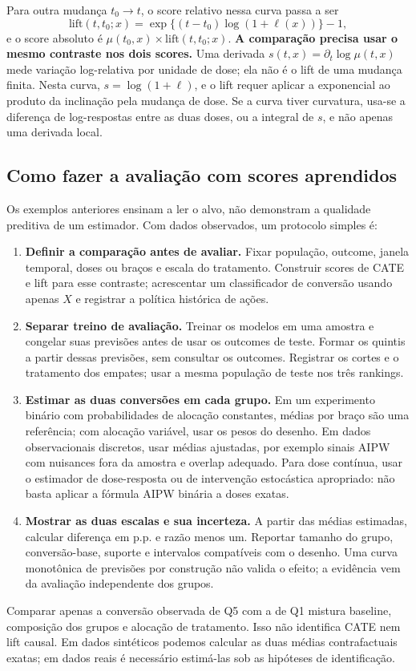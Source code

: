 Para outra mudança $t_0\to t$, o score relativo nessa curva passa a ser
\[
\mathrm{lift}(t,t_0;x)=\exp\{(t-t_0)\log(1+\ell(x))\}-1,
\]
e o score absoluto é $\mu(t_0,x)\times\mathrm{lift}(t,t_0;x)$. \textbf{A comparação precisa usar o mesmo contraste nos dois scores.} Uma derivada $s(t,x)=\partial_t\log\mu(t,x)$ mede variação log-relativa por unidade de dose; ela não é o lift de uma mudança finita. Nesta curva, $s=\log(1+\ell)$, e o lift requer aplicar a exponencial ao produto da inclinação pela mudança de dose. Se a curva tiver curvatura, usa-se a diferença de log-respostas entre as duas doses, ou a integral de $s$, e não apenas uma derivada local.

\subsection{Como fazer a avaliação com scores aprendidos}
Os exemplos anteriores ensinam a ler o alvo, não demonstram a qualidade preditiva de um estimador. Com dados observados, um protocolo simples é:
\begin{enumerate}
\item \textbf{Definir a comparação antes de avaliar.} Fixar população, outcome, janela temporal, doses ou braços e escala do tratamento. Construir scores de CATE e lift para esse contraste; acrescentar um classificador de conversão usando apenas $X$ e registrar a política histórica de ações.
\item \textbf{Separar treino de avaliação.} Treinar os modelos em uma amostra e congelar suas previsões antes de usar os outcomes de teste. Formar os quintis a partir dessas previsões, sem consultar os outcomes. Registrar os cortes e o tratamento dos empates; usar a mesma população de teste nos três rankings.
\item \textbf{Estimar as duas conversões em cada grupo.} Em um experimento binário com probabilidades de alocação constantes, médias por braço são uma referência; com alocação variável, usar os pesos do desenho. Em dados observacionais discretos, usar médias ajustadas, por exemplo sinais AIPW com nuisances fora da amostra e overlap adequado. Para dose contínua, usar o estimador de dose-resposta ou de intervenção estocástica apropriado: não basta aplicar a fórmula AIPW binária a doses exatas.
\item \textbf{Mostrar as duas escalas e sua incerteza.} A partir das médias estimadas, calcular diferença em p.p. e razão menos um. Reportar tamanho do grupo, conversão-base, suporte e intervalos compatíveis com o desenho. Uma curva monotônica de previsões por construção não valida o efeito; a evidência vem da avaliação independente dos grupos.
\end{enumerate}
Comparar apenas a conversão observada de Q5 com a de Q1 mistura baseline, composição dos grupos e alocação de tratamento. Isso não identifica CATE nem lift causal. Em dados sintéticos podemos calcular as duas médias contrafactuais exatas; em dados reais é necessário estimá-las sob as hipóteses de identificação.

